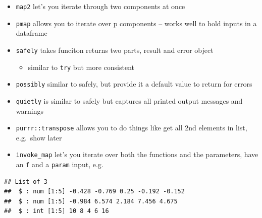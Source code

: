\documentclass[]{book}
\newenvironment{Shaded}{\begin{snugshade}}{\end{snugshade}}
\newcommand{\DataTypeTok}[1]{\textcolor[rgb]{0.13,0.29,0.53}{#1}}
\newcommand{\DecValTok}[1]{\textcolor[rgb]{0.00,0.00,0.81}{#1}}
\newcommand{\KeywordTok}[1]{\textcolor[rgb]{0.13,0.29,0.53}{\textbf{#1}}}
\newcommand{\NormalTok}[1]{#1}
\newcommand{\OperatorTok}[1]{\textcolor[rgb]{0.81,0.36,0.00}{\textbf{#1}}}
\newcommand{\StringTok}[1]{\textcolor[rgb]{0.31,0.60,0.02}{#1}}
\providecommand{\tightlist}{%
  \setlength{\itemsep}{0pt}\setlength{\parskip}{0pt}}
\theoremstyle{definition}
\theoremstyle{definition}
\theoremstyle{definition}
\theoremstyle{remark}
\begin{document}
\begin{itemize}
\tightlist
\item
  \texttt{map2} let's you iterate through two components at once
\item
  \texttt{pmap} allows you to iterate over p components -- works well to
  hold inputs in a dataframe
\item
  \texttt{safely} takes funciton returns two parts, result and error
  object

  \begin{itemize}
  \tightlist
  \item
    similar to \texttt{try} but more consistent
  \end{itemize}
\item
  \texttt{possibly} similar to safely, but provide it a default value to
  return for errors
\item
  \texttt{quietly} is similar to safely but captures all printed output
  messages and warnings
\item
  \texttt{purrr::transpose} allows you to do things like get all 2nd
  elements in list, e.g.~show later
\item
  \texttt{invoke\_map} let's you iterate over both the functions and the
  parameters, have an \texttt{f} and a \texttt{param} input, e.g.~
\end{itemize}

\begin{Shaded}
\end{Shaded}

\begin{verbatim}
## List of 3
##  $ : num [1:5] -0.428 -0.769 0.25 -0.192 -0.152
##  $ : num [1:5] -0.984 6.574 2.184 7.456 4.675
##  $ : int [1:5] 10 8 4 6 16
\end{verbatim}
\end{document}
